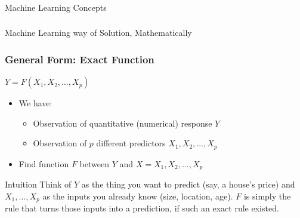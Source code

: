 \begin{frame}[fragile]\frametitle{}
\begin{center}
{\Large Machine Learning Concepts}
\end{center}
\end{frame}

\begin{frame}[fragile]\frametitle{}
\begin{center}
{\Large Machine Learning way of Solution, Mathematically}
\end{center}
\end{frame}


\begin{frame}[fragile]\frametitle{General Form: Exact Function}
$Y= F(X_1, X_2,\ldots, X_p)$
\begin{itemize}
\item We have:
	\begin{itemize}
	\item Observation of quantitative (numerical) response $Y$
	\item Observation of $p$ different predictors ${X_1, X_2, \ldots, X_p}$
	\end{itemize}
	\item Find function $F$ between $Y$ and $X = {X_1, X_2,\ldots, X_p}$
\end{itemize}
\begin{block}{Intuition}
Think of $Y$ as the thing you want to predict (say, a house's price) and $X_1,\ldots,X_p$ as the inputs you already know (size, location, age). $F$ is simply the rule that turns those inputs into a prediction, if such an exact rule existed.
\end{block}
\end{frame}

